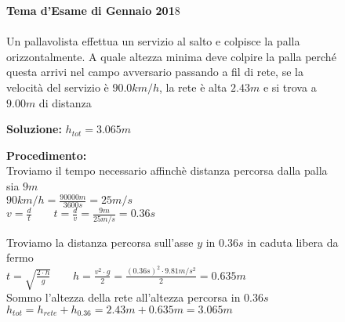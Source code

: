 \begin{figure}[h!]
\textbf{Tema d'Esame di Gennaio 201}8\\ \\
Un pallavolista effettua un servizio al salto e colpisce la palla orizzontalmente. A
quale altezza minima deve colpire la palla perché questa arrivi nel campo
avversario passando a fil di rete, se la velocità del servizio è $90.0 km/h$, la rete è
alta $2.43 m$ e si trova a $9.00 m$ di distanza\\ 

\begin{boxed}

\null\hfill \textbf{Soluzione: } $h_{tot} = 3.065m$

\textbf{Procedimento: }\\
Troviamo il tempo necessario affinchè distanza percorsa dalla palla sia $9m$\\
$90km/h=\frac{90000m}{3600s}=25m/s$  \\
$v=\frac{d}{t} \qquad t=\frac{d}{v}=\frac{9m}{25m/s}=0.36s$

Troviamo la distanza percorsa sull'asse $y$ in $0.36s$ in caduta libera da fermo\\
$t=\sqrt{\frac{2\cdot h}{g}} \qquad h=\frac{v^2\cdot g}{2}= \frac{(0.36s)^2\cdot 9.81m/s^2}{2}=0.635m$\\

Sommo l'altezza della rete all'altezza percorsa in $0.36s$ \\
$h_{tot}=h_{rete} + h_{0.36} = 2.43m + 0.635m =3.065m$

\end{boxed}
\end{figure}

